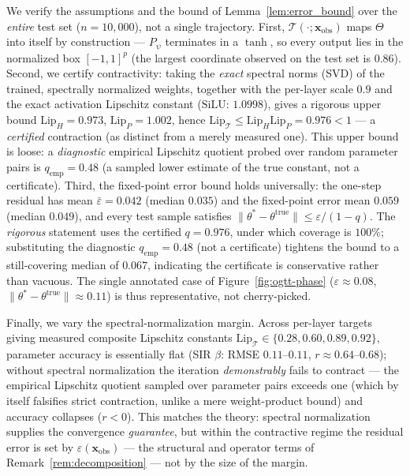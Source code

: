 We verify the assumptions and the bound of Lemma~\ref{lem:error_bound} over the \emph{entire} test set
($n=10{,}000$), not a single trajectory. First, $\mathcal{T}(\cdot;\mathbf{x}_\mathrm{obs})$ maps
$\Theta$ into itself by construction --- $P_\psi$ terminates in a $\tanh$, so every output lies in the
normalized box $[-1,1]^p$ (the largest coordinate observed on the test set is $0.86$). Second, we
certify contractivity: taking the \emph{exact} spectral norms (SVD) of the trained, spectrally
normalized weights, together with the per-layer scale $0.9$ and the exact activation Lipschitz constant
($\mathrm{SiLU}$: $1.0998$), gives a rigorous upper bound $\mathrm{Lip}_H=0.973$, $\mathrm{Lip}_P=1.002$,
hence $\mathrm{Lip}_\mathcal{T}\le\mathrm{Lip}_H\mathrm{Lip}_P=0.976<1$ --- a \emph{certified}
contraction (as distinct from a merely measured one). This upper bound is loose: a \emph{diagnostic} empirical Lipschitz
quotient probed over random parameter pairs is $q_{\mathrm{emp}}=0.48$ (a sampled lower estimate of the
true constant, not a certificate). Third, the fixed-point error bound holds universally: the one-step
residual has mean $\bar\varepsilon=0.042$ (median $0.035$) and the fixed-point error mean $0.059$ (median
$0.049$), and every test sample satisfies $\|\theta^*-\theta^{\mathrm{true}}\|\le\varepsilon/(1-q)$. The
\emph{rigorous} statement uses the certified $q=0.976$, under which coverage is $100\%$; substituting the
diagnostic $q_{\mathrm{emp}}=0.48$ (not a certificate) tightens the bound to a still-covering median of
$0.067$, indicating the certificate is conservative rather than vacuous. The single annotated case of
Figure~\ref{fig:ogtt-phase} ($\varepsilon\approx0.08$, $\|\theta^*-\theta^{\mathrm{true}}\|\approx0.11$)
is thus representative, not cherry-picked.

Finally, we vary the spectral-normalization margin. Across per-layer targets giving measured composite
Lipschitz constants $\mathrm{Lip}_\mathcal{T}\in\{0.28,0.60,0.89,0.92\}$, parameter accuracy is
essentially flat (SIR $\beta$: RMSE $0.11$--$0.11$, $r\approx0.64$--$0.68$); without spectral
normalization the iteration \emph{demonstrably} fails to contract --- the empirical Lipschitz quotient
sampled over parameter pairs exceeds one (which by itself falsifies strict contraction, unlike a mere
weight-product bound) and accuracy collapses ($r<0$). This matches the theory: spectral normalization supplies the convergence
\emph{guarantee}, but within the contractive regime the residual error is set by
$\varepsilon(\mathbf{x}_\mathrm{obs})$ --- the structural and operator terms of
Remark~\ref{rem:decomposition} --- not by the size of the margin.

